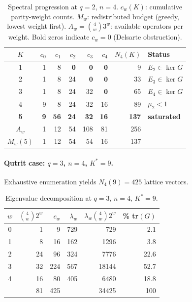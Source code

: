 \documentclass[twocolumn,prx,aps,superscriptaddress,longbibliography]{revtex4-2}
\begin{document}
\begin{table}[ht!]
\caption{Spectral progression at $q = 2$, $n = 4$.
$c_w(K)$: cumulative parity-weight counts.
$M_w$: redistributed budget (greedy, lowest weight first).
$A_w = \binom{4}{w}3^w$: available operators per weight.
Bold zeros indicate $c_w = 0$ (Delsarte obstruction).}
\label{tab:q2-progression}
\begin{ruledtabular}
\begin{tabular}{crrrrrrl}
$K$ & $c_0$ & $c_1$ & $c_2$ & $c_3$ & $c_4$ & $N_4(K)$ & Status \\
\hline
1 & 1 & 8 & $\mathbf{0}$ & $\mathbf{0}$ & $\mathbf{0}$ & 9 & $E_2 \in \ker G$ \\
2 & 1 & 8 & 24 & $\mathbf{0}$ & $\mathbf{0}$ & 33 & $E_3 \in \ker G$ \\
3 & 1 & 8 & 24 & 32 & $\mathbf{0}$ & 65 & $E_4 \in \ker G$ \\
4 & 9 & 8 & 24 & 32 & 16 & 89 & $\mu_2 < 1$ \\
\textbf{5} & \textbf{9} & \textbf{56} & \textbf{24} & \textbf{32} & \textbf{16} & \textbf{137} & \textbf{saturated} \\
\hline
$A_w$ & 1 & 12 & 54 & 108 & 81 & 256 & \\
$M_w(5)$ & 1 & 12 & 54 & 54 & 16 & 137 & \\
\end{tabular}
\end{ruledtabular}
\end{table}

\paragraph{Qutrit case: $q = 3$, $n = 4$, $K^* = 9$.}
Exhaustive enumeration yields $N_4(9) = 425$ lattice vectors.

\begin{table}[ht!]
\caption{Eigenvalue decomposition at $q = 3$, $n = 4$, $K^* = 9$.}
\label{tab:q3}
\begin{ruledtabular}
\begin{tabular}{crrrrr}
$w$ & $\binom{4}{w}2^w$ & $c_w$ & $\lambda_w$ &
$\lambda_w \binom{4}{w}2^w$ & \% tr$(G)$ \\
\hline
0 & 1  & 9   & 729  & 729    & 2.1  \\
1 & 8  & 16  & 162  & 1296   & 3.8  \\
2 & 24 & 96  & 324  & 7776   & 22.6 \\
3 & 32 & 224 & 567  & 18144  & 52.7 \\
4 & 16 & 80  & 405  & 6480   & 18.8 \\
\hline
  & 81 & 425 &      & 34425  & 100  \\
\end{tabular}
\end{ruledtabular}
\end{table}
\end{document}
